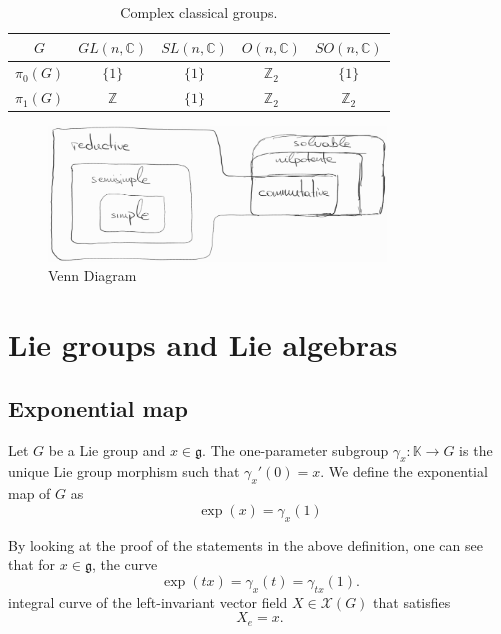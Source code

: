\documentclass{report}
\begin{document}
\begin{table}[h!]
    \centering
    \begin{tabular}{c c c c c}
        $G$ & $GL(n, \mathbb{C})$ & $SL(n, \mathbb{C})$ & $O(n, \mathbb{C})$ & $SO(n, \mathbb{C})$ \\
        \hline \hline
        $\pi_0(G)$ & $\{1\}$ & $\{1\}$ & $\mathbb{Z}_2$ & $\{1\}$ \\
        $\pi_1(G)$ & $\mathbb{Z}$ & $\{1\}$ & $\mathbb{Z}_2$ & $\mathbb{Z}_2$ \\
    \end{tabular}
    \caption{Complex classical groups.}
    \label{table:complex_classical_groups}
\end{table}
\begin{figure}[ht]
    \centering
    \includegraphics[width=0.8\textwidth]{lie_algebras_venn.jpg}
    \caption{Venn Diagram}
    \label{fig:venn}
\end{figure}

\chapter{Lie groups and Lie algebras}
\section{Exponential map}
\begin{definition}
    Let $G$ be a Lie group and $x \in \mathfrak g$.
    The one-parameter subgroup $\gamma_x: \mathbb K \to G$ is the unique Lie group morphism such that $\gamma_x'(0) = x$.
    We define the exponential map of $G$ as
    \[
    \exp(x) = \gamma_x(1)
    \]
\end{definition}
\begin{remark}
    By looking at the proof of the statements in the above definition, one can see that for $x\in \mathfrak g$, the curve
    \[
    \exp(tx) = \gamma_x(t) = \gamma_{tx}(1).
    \]
    integral curve of the left-invariant vector field $X \in \mathcal X(G)$ that satisfies
    \[
    X_e = x.
    \]
\end{remark}
\end{document}
